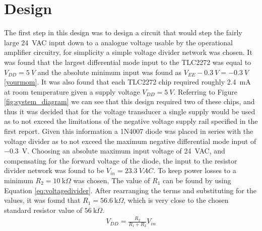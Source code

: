 \section{Design} \label{sec:design_voltage_peak_transducer}
The first step in this design was to design a circuit that would step the fairly large \SI{24}{VAC} input down to a analogue voltage usable by the operational amplifier circuitry, for simplicity a simple voltage divider network was chosen. It was found that the largest differential mode input to the TLC2272 was equal to $V_{DD}=\SI{5}{V}$ and the absolute minimum input was found as $V_{EE}-\SI{0.3}{V}=\SI{-0.3}{V}$ \ref{yourmom}. It was also found that each TLC2272 chip required roughly \SI{2.4}{\milli A} at room temperature given a supply voltage $V_{DD}=\SI{5}{V}$. Referring to Figure \ref{fig:system_diagram} we can see that this design required two of these chips, and thus it was decided that for the voltage transducer a single supply would be used as to not exceed the limitations of the negative voltage supply rail specified in the first report. 
Given this information a 1N4007 diode was placed in series with the voltage divider as to not exceed the maximum negative differential mode input of \SI{-0.3}{V}. Choosing an absolute maximum input voltage of \SI{24}{VAC}, and compensating for the forward voltage of the diode, the input to the resistor divider network was found to be $V_{in}=\SI{23.3}{VAC}$. To keep power losses to a minimum $R_{2}=\SI{10}{\kilo \Omega}$ was chosen, The value of $R_{1}$ can be found by using Equation \ref{eq:voltagedivider}. After rearranging the terms and substituting for the values, it was found that $R_{1}=\SI{56.6}{\kilo \Omega}$, which is very close to the chosen standard resistor value of $\SI{56}{\kilo \Omega}$.\newline
\begin{align}
   V_{DD}=\frac{R_2}{R_1+R_2}V_{in}
   \label{eq:voltagedivider}
\end{align}
